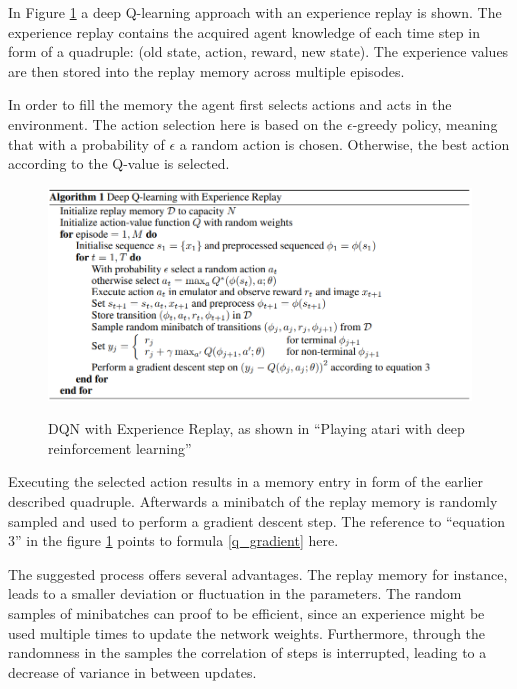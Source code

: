 In Figure \ref{fig:dqn_algo_code} a deep Q-learning approach with an experience replay is shown. The experience replay contains the acquired agent knowledge of each time step in form of a quadruple: (old state, action, reward, new state). The experience values are then stored into the replay memory across multiple episodes. 

In order to fill the memory the agent first selects actions and acts in the environment. The action selection here is based on the $\epsilon$-greedy policy, meaning that with a probability of $\epsilon$ a random action is chosen. Otherwise, the best action according to the Q-value is selected.

\begin{figure}[hpbt]
    \centering
    \includegraphics[width=1\textwidth]{pictures/dqn_algo_code.png}\\
    \caption[DQN with Experience Replay]{DQN with Experience Replay, as shown in ``Playing atari with deep reinforcement learning'' \cite{mnka13}}\label{fig:dqn_algo_code}
\end{figure}

Executing the selected action results in a memory entry in form of the earlier described quadruple. Afterwards a  minibatch of the replay memory is randomly sampled and used to perform a gradient descent step. The reference to ``equation 3'' in the figure \ref{fig:dqn_algo_code} points to formula \ref{q_gradient} here.

The suggested process offers several advantages. The replay memory for instance, leads to a smaller deviation or fluctuation in the parameters. The random samples of minibatches can proof to be efficient, since an experience might be used multiple times to update the network weights. Furthermore, through the randomness in the samples the correlation of steps is interrupted, leading to a decrease of variance in between updates. 